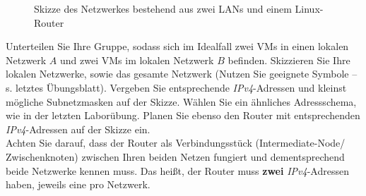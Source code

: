 \documentclass[paper=a4,fontsize=11pt]{scrartcl}%
\numberwithin{equation}{section}
\begin{document}
\begin{enumerate}
\begin{figure}[H]
	\caption{Skizze des Netzwerkes bestehend aus zwei LANs und einem Linux-Router}
	\label{sketch_lan}
	\end{figure}
	\begin{tasks}
		\task Unterteilen Sie Ihre Gruppe, sodass sich im Idealfall zwei VMs in einen lokalen Netzwerk $A$ und zwei VMs im lokalen Netzwerk $B$ befinden.
		\task Skizzieren Sie Ihre lokalen Netzwerke, sowie das gesamte Netzwerk (Nutzen Sie geeignete Symbole -- s. letztes Übungsblatt).
		\task Vergeben Sie entsprechende \emph{IPv4}-Adressen und kleinst mögliche Subnetzmasken auf der Skizze. Wählen Sie ein ähnliches Adressschema, wie in der letzten Laborübung.
		\task Planen Sie ebenso den Router mit entsprechenden \emph{IPv4}-Adressen auf der Skizze ein.\\
		Achten Sie darauf, dass der Router als Verbindungsstück (Intermediate-Node/ Zwischenknoten) zwischen Ihren beiden Netzen fungiert und dementsprechend beide Netzwerke kennen muss. Das heißt, der Router muss \textbf{zwei} \emph{IPv4}-Adressen haben, jeweils eine pro Netzwerk.
	\end{tasks}
\end{enumerate}
\end{document}
